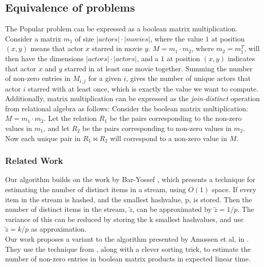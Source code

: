 \documentclass[a4paper,11pt]{article}
\begin{document}
\subsection{Equivalence of problems}
The Popular problem can be expressed as a boolean matrix multiplication. Consider a matrix $m_1$ of size $|actors| \cdot |movies|$, where the value $1$ at position $(x, y)$ means that actor $x$ starred in movie $y$. $M = m_1 \cdot m_2$, where $m_2 = m_1^T$, will then have the dimensions $|actors| \cdot |actors|$, and a $1$ at position $(x, y)$ indicates that actor $x$ and $y$ starred in at least one movie together. Summing the number of non-zero entries in $M_{i,j}$ for a given $i$, gives the number of unique actors that actor $i$ starred with at least once, which is exactly the value we want to compute.\\
Additionally, matrix multiplication can be expressed as the \emph{join-distinct} operation from relational algebra as follows: Consider the boolean matrix multiplication: $M = m_1 \cdot m_2$. Let the relation $R_1$ be the pairs corresponding to the non-zero values in $m_1$, and let $R_2$ be the pairs corresponding to non-zero values in $m_2$. Now each unique pair in $R_1 \Join R_2$ will correspond to a non-zero value in $M$.

\subsubsection{Related Work}
Our algorithm builds on the work by Bar-Yossef \cite{paper:bar-yos}, which presents a technique for estimating the number of distinct items in a stream, using $O(1)$ space. If every item in the stream is hashed, and the smallest hashvalue, p, is stored. Then the number of distinct items in the stream, $\tilde{z}$, can be approximated by $\tilde{z}=1/p$. The variance of this can be reduced by storing the k smallest hashvalues, and use $\tilde{z}=k/p$ as approximation.\\

Our work proposes a variant to the algorithm presented by Amossen et al, in \cite{paper:amossen}. They use the technique from \cite{paper:bar-yos}, along with a clever sorting trick, to estimate the number of non-zero entries in boolean matrix products in expected linear time. 

\end{document}
